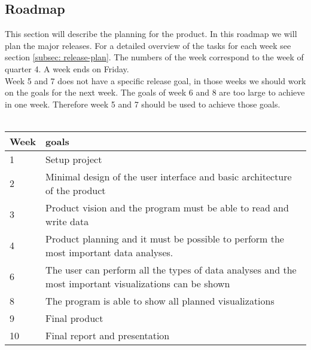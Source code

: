 \subsection{Roadmap}
\label{subsec: roadmap}
This section will describe the planning for the product. In this roadmap we will plan the major releases. For a detailed overview of the tasks for each week see section \ref{subsec: release-plan}. The numbers of the week correspond to the week of quarter 4. A week ends on Friday.\\
Week 5 and 7 does not have a specific release goal, in those weeks we should work on the goals for the next week. The goals of week 6 and 8 are too large to achieve in one week. Therefore week 5 and 7 should be used to achieve those goals.\\\\
\begin{tabular}[H]{ l p{10cm} }
Week & goals \\
\hline
1 & Setup project \\
2 & Minimal design of the user interface and basic architecture of the product \\
3 & Product vision and the program must be able to read and write data\\
4 & Product planning and it must be possible to perform the most important data analyses. \\
6 & The user can perform all the types of data analyses and the most important visualizations can be shown \\
8 & The program is able to show all planned visualizations \\
9 & Final product \\
10 & Final report and presentation
\end{tabular}
